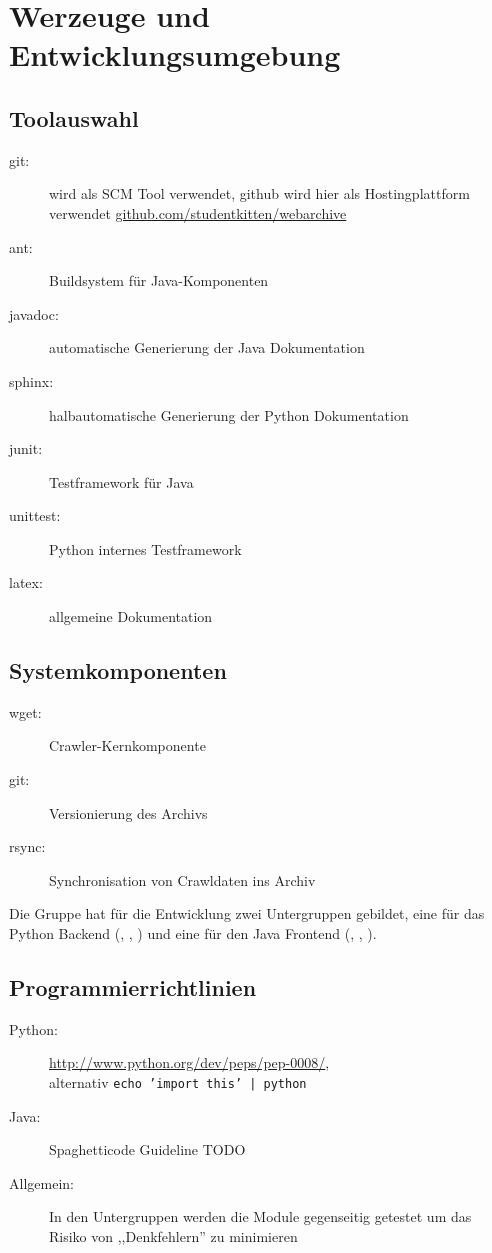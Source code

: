 \chapter{Werzeuge und Entwicklungsumgebung}
\label{cha:werzeuge_und_entwicklungsumgebung}

\section{Toolauswahl} 
\label{sec:toolauswahl}

\begin{description}
    \item [git:] wird als SCM Tool verwendet, github wird hier als 
        Hostingplattform verwendet \url{github.com/studentkitten/webarchive}
    \item [ant:] Buildsystem für Java-Komponenten
    \item [javadoc:] automatische Generierung der Java Dokumentation
    \item [sphinx:] halbautomatische Generierung der Python Dokumentation
    \item [junit:] Testframework für Java
    \item [unittest:] Python internes Testframework 
    \item [latex:] allgemeine Dokumentation
    
\end{description}


\section{Systemkomponenten} 
\label{sec:systemkomponenten}
\begin{description}
    \item [wget:] Crawler-Kernkomponente
    \item [git:] Versionierung des Archivs
    \item [rsync:] Synchronisation von Crawldaten ins Archiv
\end{description}


Die Gruppe hat für die Entwicklung zwei Untergruppen gebildet, 
eine für das Python Backend (\ciii, \flo, \ci) und eine für den Java Frontend
(\cii, \sab, \eddy).

\section{Programmierrichtlinien} 
\label{sec:guidelines}
\begin{description}
    \item [Python:] \url{http://www.python.org/dev/peps/pep-0008/}, \\alternativ \texttt{echo 'import this' | python}
    \item [Java:] Spaghetticode Guideline TODO
    \item [Allgemein:] In den Untergruppen werden die Module gegenseitig getestet um das Risiko von ,,Denkfehlern'' zu minimieren
\end{description}


